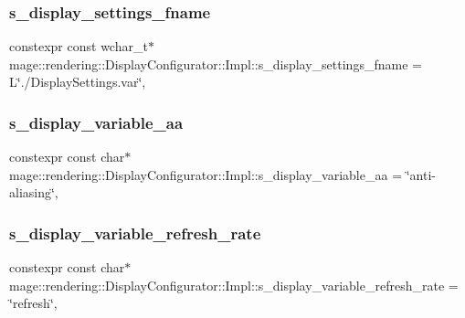 \subsubsection{\texorpdfstring{s\+\_\+display\+\_\+settings\+\_\+fname}{s\_display\_settings\_fname}}
{\footnotesize\ttfamily constexpr const wchar\+\_\+t$\ast$ mage\+::rendering\+::\+Display\+Configurator\+::\+Impl\+::s\+\_\+display\+\_\+settings\+\_\+fname = L\char`\"{}./Display\+Settings.\+var\char`\"{}\hspace{0.3cm}{\ttfamily [static]}, {\ttfamily [private]}}

\hypertarget{classmage_1_1rendering_1_1_display_configurator_1_1_impl_aaff98797b745244f86a75458f49bc806}{}\label{classmage_1_1rendering_1_1_display_configurator_1_1_impl_aaff98797b745244f86a75458f49bc806} 
\subsubsection{\texorpdfstring{s\+\_\+display\+\_\+variable\+\_\+aa}{s\_display\_variable\_aa}}
{\footnotesize\ttfamily constexpr const char$\ast$ mage\+::rendering\+::\+Display\+Configurator\+::\+Impl\+::s\+\_\+display\+\_\+variable\+\_\+aa = \char`\"{}anti-\/aliasing\char`\"{}\hspace{0.3cm}{\ttfamily [static]}, {\ttfamily [private]}}

\hypertarget{classmage_1_1rendering_1_1_display_configurator_1_1_impl_abda6f50d13c1e4118ba0f022818b15c9}{}\label{classmage_1_1rendering_1_1_display_configurator_1_1_impl_abda6f50d13c1e4118ba0f022818b15c9} 
\subsubsection{\texorpdfstring{s\+\_\+display\+\_\+variable\+\_\+refresh\+\_\+rate}{s\_display\_variable\_refresh\_rate}}
{\footnotesize\ttfamily constexpr const char$\ast$ mage\+::rendering\+::\+Display\+Configurator\+::\+Impl\+::s\+\_\+display\+\_\+variable\+\_\+refresh\+\_\+rate = \char`\"{}refresh\char`\"{}\hspace{0.3cm}{\ttfamily [static]}, {\ttfamily [private]}}


